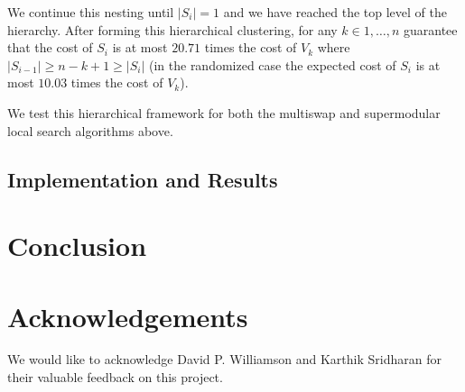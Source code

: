 \documentclass{article}
\begin{document}
We continue this nesting until $|S_i| = 1$ and we have reached the top level of the hierarchy. After forming this hierarchical clustering, for any $k \in 1, \ldots, n$ \cite{Lin} guarantee that the cost of $S_i$ is at most $20.71$ times the cost of $V_k$ where $|S_{i-1}| \geq n-k+1 \geq |S_{i}|$ (in the randomized case the expected cost of $S_i$ is at most $10.03$ times the cost of $V_k$).

We test this hierarchical framework for both the multiswap and supermodular local search algorithms above. 

\subsection{Implementation and Results}


\section{Conclusion}

\section{Acknowledgements}
We would like to acknowledge David P. Williamson and Karthik Sridharan for their valuable feedback on this project.

\label{submission}




\end{document}
